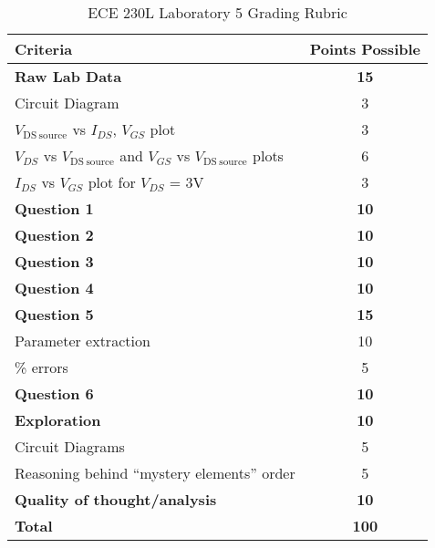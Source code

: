 \documentclass[12pt]{../manual}
\begin{document}
%
\newpage
{}
{}
\hspace{0pt}
\vfill %
\begin{table}[ht!]
\caption{ECE 230L Laboratory 5 Grading Rubric}
\centering
\begin{tabular}{l|c} \hline
Criteria & Points Possible \\ \hline \hline
\textbf{Raw Lab Data} 							& \textbf{15} \\
Circuit Diagram 								& 3 \\
$V_{\mathrm{DS~source}}$ vs $I_{DS}$, $V_{GS}$ plot & 3 \\
$V_{DS}$ vs $V_{\mathrm{DS~source}}$ and $V_{GS}$ vs $V_{\mathrm{DS~source}}$ plots 	& 6 \\
$I_{DS}$ vs $V_{GS}$ plot for $V_{DS}$ = 3V 		& 3 \\ \hline
\textbf{Question 1} 							& \textbf{10} \\ \hline
\textbf{Question 2} 							& \textbf{10} \\ \hline
\textbf{Question 3} 							& \textbf{10} \\ \hline
\textbf{Question 4} 							& \textbf{10} \\ \hline
\textbf{Question 5} 							& \textbf{15} \\
Parameter extraction							& 10 \\ 
\% errors										& 5 \\ \hline
\textbf{Question 6} 							& \textbf{10} \\ \hline
\textbf{Exploration} 							& \textbf{10} \\
Circuit Diagrams								& 5 \\
Reasoning behind ``mystery elements'' order		& 5 \\ \hline
\textbf{Quality of thought/analysis} 			& \textbf{10} \\ \hline \hline
\textbf{Total} 									& \textbf{100} \\ \hline
\end{tabular}
\end{table}
\vfill %
\end{document}
